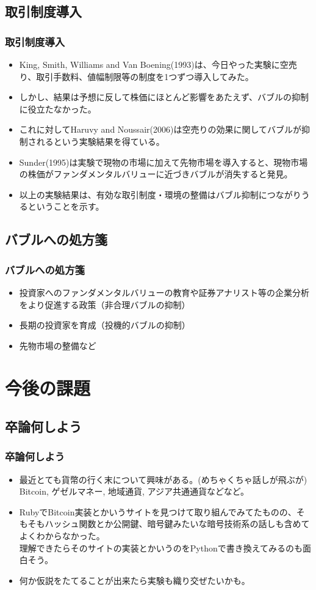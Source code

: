 \documentclass[dvipdfmx,12pt]{beamer}
\begin{document}
\subsection{取引制度導入}
\begin{frame}
\frametitle{取引制度導入}
\begin{itemize}\setlength{\parskip}{0.5em}
\item
King, Smith, Williams and Van Boening(1993)は、今日やった実験に空売り、取引手数料、値幅制限等の制度を1つずつ導入してみた。
\item
しかし、結果は予想に反して株価にほとんど影響をあたえず、バブルの抑制に役立たなかった。
\item
これに対してHaruvy and Noussair(2006)は空売りの効果に関してバブルが抑制されるという実験結果を得ている。
\item
Sunder(1995)は実験で現物の市場に加えて先物市場を導入すると、現物市場の株価がファンダメンタルバリューに近づきバブルが消失すると発見。
\item
以上の実験結果は、有効な取引制度・環境の整備はバブル抑制につながりうるということを示す。
\end{itemize}
\end{frame}


\subsection{バブルへの処方箋}
\begin{frame}
\frametitle{バブルへの処方箋}
\begin{itemize}\setlength{\parskip}{0.5em}
\item
投資家へのファンダメンタルバリューの教育や証券アナリスト等の企業分析をより促進する政策（非合理バブルの抑制）
\item
長期の投資家を育成（投機的バブルの抑制）
\item
先物市場の整備など
\end{itemize}
\end{frame}

\section{今後の課題}
\subsection{卒論何しよう}
\begin{frame}
\frametitle{卒論何しよう}
\begin{itemize}\setlength{\parskip}{0.5em}
\item
最近とても貨幣の行く末について興味がある。(めちゃくちゃ話しが飛ぶが)\\
Bitcoin, ゲゼルマネー, 地域通貨, アジア共通通貨などなど。
\item
RubyでBitcoin実装とかいうサイトを見つけて取り組んでみてたものの、そもそもハッシュ関数とか公開鍵、暗号鍵みたいな暗号技術系の話しも含めてよくわからなかった。\\
理解できたらそのサイトの実装とかいうのをPythonで書き換えてみるのも面白そう。
\item
何か仮説をたてることが出来たら実験も織り交ぜたいかも。
\end{itemize}
\end{frame}
\end{document}
